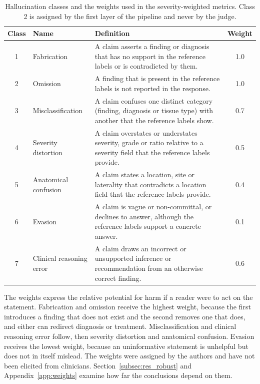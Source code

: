 \begin{table}[t]
  \centering
  \caption{Hallucination classes and the weights used in the severity-weighted metrics. Class 2 is assigned by the first layer of the pipeline and never by the judge.}
  \label{tab:taxonomy}
  \small
  \begin{tabular}{@{}clp{8.6cm}c@{}}
    \toprule
    Class & Name & Definition & Weight\\
    \midrule
    1 & Fabrication & A claim asserts a finding or diagnosis that has no support in the reference labels or is contradicted by them. & 1.0\\
    2 & Omission & A finding that is present in the reference labels is not reported in the response. & 1.0\\
    3 & Misclassification & A claim confuses one distinct category (finding, diagnosis or tissue type) with another that the reference labels show. & 0.7\\
    4 & Severity distortion & A claim overstates or understates severity, grade or ratio relative to a severity field that the reference labels provide. & 0.5\\
    5 & Anatomical confusion & A claim states a location, site or laterality that contradicts a location field that the reference labels provide. & 0.4\\
    6 & Evasion & A claim is vague or non-committal, or declines to answer, although the reference labels support a concrete answer. & 0.1\\
    7 & Clinical reasoning error & A claim draws an incorrect or unsupported inference or recommendation from an otherwise correct finding. & 0.6\\
    \bottomrule
  \end{tabular}
\end{table}

The weights express the relative potential for harm if a reader were to act on the statement. Fabrication and omission receive the highest weight, because the first introduces a finding that does not exist and the second removes one that does, and either can redirect diagnosis or treatment. Misclassification and clinical reasoning error follow, then severity distortion and anatomical confusion. Evasion receives the lowest weight, because an uninformative statement is unhelpful but does not in itself mislead. The weights were assigned by the authors and have not been elicited from clinicians. Section~\ref{subsec:res_robust} and Appendix~\ref{app:weights} examine how far the conclusions depend on them.

